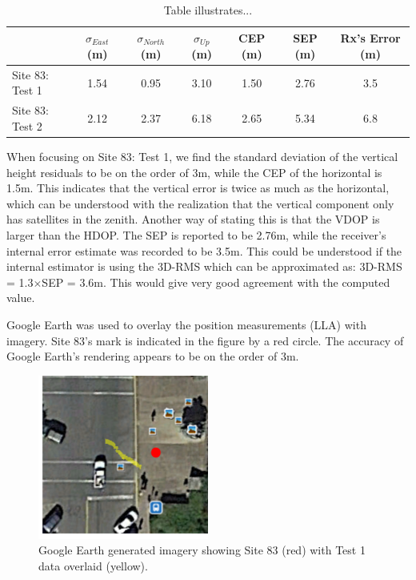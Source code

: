 \documentclass[11pt]{article}
\begin{document}
\begin{table}[h!]
\begin{center}
    \begin{tabular}{  l || c | c | c | c | c | c |}
 & $\sigma_{East}$ (m) & $\sigma_{North}$ (m) & $\sigma_{Up}$ (m) & CEP (m) & SEP (m) & Rx's Error (m)\\\hline
 \hline
Site 83: Test 1 & 1.54 & 0.95 & 3.10 & 1.50 & 2.76 & 3.5\\\hline
Site 83: Test 2 & 2.12 & 2.37 & 6.18 & 2.65 & 5.34 & 6.8\\\hline
    \end{tabular}
\caption{Table illustrates...}
\label{tab:mustang}
\end{center}
\end{table}

When focusing on Site 83: Test 1, we find the standard deviation of the vertical height residuals to be on the order of 3m, while the CEP of the horizontal is 1.5m. This indicates that the vertical error is twice as much as the horizontal, which can be understood with the realization that the vertical component only has satellites in the zenith. Another way of stating this is that the VDOP is larger than the HDOP. The SEP is reported to be 2.76m, while the receiver's internal error estimate was recorded to be 3.5m. This could be understood if the internal estimator is using the 3D-RMS which can be approximated as: 3D-RMS = 1.3$\times$SEP = 3.6m. This would give very good agreement with the computed value.


Google Earth was used to overlay the position measurements (LLA) with imagery. Site 83's mark is indicated in the figure by a red circle. The accuracy of Google Earth's rendering appears to be on the order of 3m.

\begin{figure}[h]
\begin{center}
\includegraphics[width=0.5\textwidth]{googleEarth}
\end{center}
\caption{Google Earth generated imagery showing Site 83 (red) with Test 1 data overlaid (yellow).}
\label{fig:googleEarth}
\end{figure}
\end{document}
